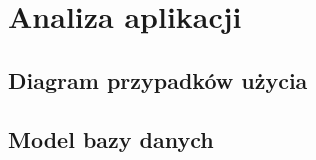 \chapter{Analiza aplikacji}
\label{cha:analizaAplikacji}

\section{Diagram przypadków użycia}
\label{sec:przypadkiUzycia}
\noindent
\begin{minipage}{\linewidth}
\label{use-case}
\end{minipage}

\section{Model bazy danych}
\label{sec;modelBazyDanych}

